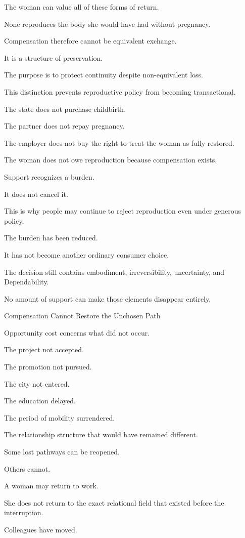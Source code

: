 The woman can value all of these forms of return.

None reproduces the body she would have had without pregnancy.

Compensation therefore cannot be equivalent exchange.

It is a structure of preservation.

The purpose is to protect continuity despite non-equivalent loss.

This distinction prevents reproductive policy from becoming transactional.

The state does not purchase childbirth.

The partner does not repay pregnancy.

The employer does not buy the right to treat the woman as fully restored.

The woman does not owe reproduction because compensation exists.

Support recognizes a burden.

It does not cancel it.

This is why people may continue to reject reproduction even under generous policy.

The burden has been reduced.

It has not become another ordinary consumer choice.

The decision still contains embodiment, irreversibility, uncertainty, and Dependability.

No amount of support can make those elements disappear entirely.

Compensation Cannot Restore the Unchosen Path

Opportunity cost concerns what did not occur.

The project not accepted.

The promotion not pursued.

The city not entered.

The education delayed.

The period of mobility surrendered.

The relationship structure that would have remained different.

Some lost pathways can be reopened.

Others cannot.

A woman may return to work.

She does not return to the exact relational field that existed before the interruption.

Colleagues have moved.

